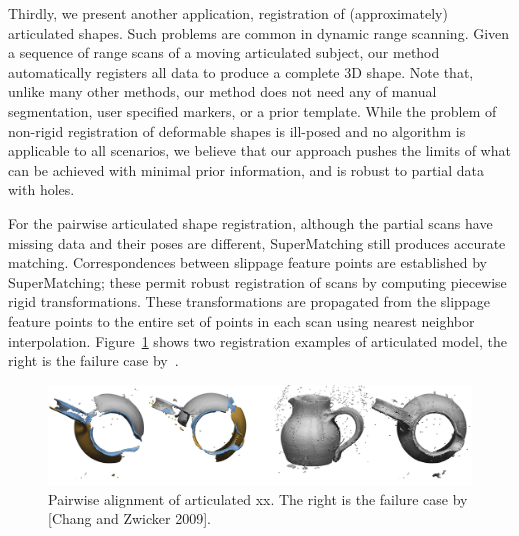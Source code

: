 Thirdly, we present another application, registration of (approximately) articulated shapes. Such problems are common in dynamic range scanning.
Given a sequence of range scans of a moving articulated subject, our method automatically registers all data to produce a complete 3D shape.
Note that, unlike many other methods, our method does not need any of manual segmentation, user specified markers, or a prior template.
While the problem of non-rigid registration of deformable shapes is ill-posed and no algorithm is applicable to all scenarios,
we believe that our approach pushes the limits of what can be achieved with minimal prior information, and is robust to partial data with holes.

For the pairwise articulated shape registration,
although the partial scans have missing data and their poses are different, SuperMatching still produces accurate matching.
Correspondences between slippage feature points are established by SuperMatching;
these permit robust registration of scans by computing piecewise rigid transformations.
These transformations are propagated from the slippage feature points to the entire set of points in each scan using nearest neighbor interpolation.
Figure~\ref{fig:3DRobot} shows two registration examples of articulated model, the right is the failure case by~\cite{Chang09}.

\begin{figure}[h]
\centering
  \includegraphics[width=0.99\linewidth]{figures/rigidCMP.jpg}
  \caption{Pairwise alignment of articulated xx. The right is the failure case by [Chang and Zwicker 2009]. }
\label{fig:3DRobot}
\end{figure}

